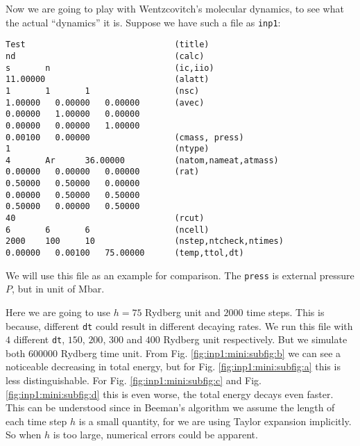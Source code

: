 Now we are going to play with Wentzcovitch's molecular dynamics, to see what the
actual ``dynamics'' it is. Suppose we have such a file as \texttt{inp1}:
\begin{verbatim}
Test                              (title)
nd                                (calc)
s       n                         (ic,iio)
11.00000                          (alatt)
1       1       1                 (nsc)
1.00000   0.00000   0.00000       (avec)
0.00000   1.00000   0.00000
0.00000   0.00000   1.00000
0.00100   0.00000                 (cmass, press)
1                                 (ntype)
4       Ar      36.00000          (natom,nameat,atmass)
0.00000   0.00000   0.00000       (rat)
0.50000   0.50000   0.00000
0.00000   0.50000   0.50000
0.50000   0.00000   0.50000
40                                (rcut)
6       6       6                 (ncell)
2000    100     10                (nstep,ntcheck,ntimes)
0.00000   0.00100   75.00000      (temp,ttol,dt)
\end{verbatim}
We will use this file as an example for comparison.
The \texttt{press} is external pressure $P$, but in unit of \si{\mega\bar}.

Here we are going to use $h = 75$ Rydberg unit and $2000$ time steps. This is because, different \texttt{dt} could result in different decaying rates.
We run this file with $4$ different \texttt{dt}, $150$, $200$, $300$ and $400$
Rydberg unit respectively.
But we simulate both $600000$ Rydberg time unit. From Fig. \ref{fig:inp1:mini:subfig:b} we can see a noticeable
decreasing in total energy, but for Fig. \ref{fig:inp1:mini:subfig:a} this is less distinguishable. For Fig. \ref{fig:inp1:mini:subfig:c} and Fig. \ref{fig:inp1:mini:subfig:d}
this is even worse, the total energy decays even faster. This can be understood since in
Beeman's algorithm we assume the length of each time step $h$ is a small quantity,
for we are using Taylor expansion implicitly. So when $h$ is too large, numerical errors
could be apparent.

